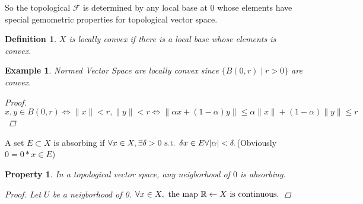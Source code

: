 \documentclass{article}
\newtheorem*{property}{Property}
\newtheorem*{definition}{Definition}
\newtheorem*{example}{Example}
\begin{document}
  So the topological $\mathcal{F}$ is determined by any local base at $0$ 
  whose elements have special gemometric properties for topological vector space.
\begin{definition}
  $X$ is locally convex if there is a local base whose elements is convex.
\end{definition}
\begin{example}
  Normed Vector Space are locally convex since $\{B(0, r) \mid r > 0\}$ are convex.
  \begin{proof}
    $
    x, y \in B(0, r) \Leftrightarrow \|x\| < r, \|y\| < r \Leftrightarrow 
    \|\alpha x + (1 - \alpha)y\| \le \alpha\|x\| + (1 - \alpha)\|y\| \le r
    $
  \end{proof}
\end{example}
A set $E \subset X$ is absorbing if 
$
\forall x \in X, \exists \delta > 0 \textnormal{ s.t. } \delta x \in E 
\forall |\alpha| < \delta.
$(Obviously $0 = 0 * x \in E$)

\begin{property}
In a topological vector space, any neigborhood of $0$ is absorbing.
\begin{proof}
  Let $U$ be a neigborhood of 0. 
  $
  \forall x \in X, \textnormal{ the map } \mathbb{R} \leftarrow X
  \textnormal{ is continuous.}
  $
\end{proof}
\end{property}
\end{document}
